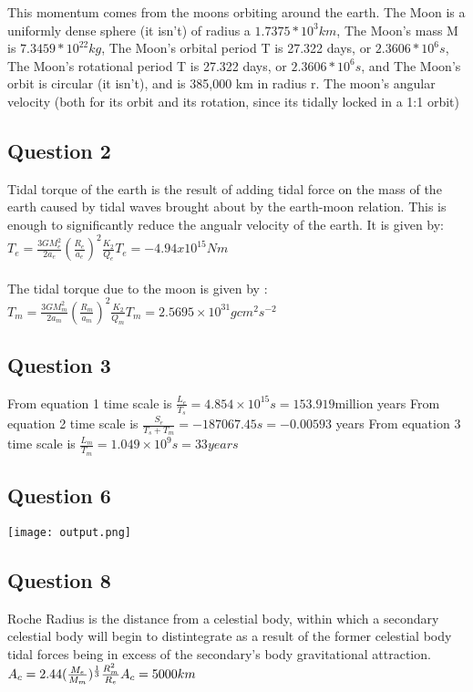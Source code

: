\documentclass[11pt]{article}
\begin{document}
This momentum comes from the moons orbiting around the earth. The Moon
is a uniformly dense sphere (it isn't) of radius a $1.7375*10^3 km$, The
Moon's mass M is $7.3459*10^{22} kg$, The Moon's orbital period T is 27.322
days, or $2.3606*10^6 s$, The Moon's rotational period T is 27.322 days, or
$2.3606*10^6 s$, and The Moon's orbit is circular (it isn't), and is 385,000
km in radius r. The moon's angular velocity (both for its orbit and its
rotation, since its tidally locked in a 1:1 orbit)
\newpage
\subsection{Question 2}\label{question-2}

    Tidal torque of the earth is the result of adding tidal force on the
mass of the earth caused by tidal waves brought about by the earth-moon
relation. This is enough to significantly reduce the angualr velocity of
the earth. It is given by:\\
$T_e=\frac{3GM_e^{2}}{2a_e}(\frac{R_e}{a_e})^2\frac{K_2}{Q_e}
T_e =-4.94x10^{15}Nm$\\
\\
The tidal torque due to the moon is given by :\\
$T_m=\frac{3GM_m^{2}}{2a_m}(\frac{R_m}{a_m})^2\frac{K_2}{Q_m} 
T_m=2.5695×10^{31}gcm^2s^{-2}$

\newpage
\subsection{Question 3}\label{question-3}

From equation 1 time scale is $\frac{L_e}{T_s}=4.854×10^{15}s=153.919$million years 
From equation 2 time scale is $\frac{S_e}{T_s+T_m}=-187067.45s=-0.00593$ years 
From equation 3 time scale is $\frac{L_m}{T_m}=1.049×10^9s=33years$

\newpage
\subsection{Question 6}\label{question-6}
\texttt{[image: output.png]}

\newpage
\subsection{Question 8}\label{question-8}

    Roche Radius is the distance from a celestial body, within which a
secondary celestial body will begin to distintegrate as a result of the
former celestial body tidal forces being in excess of the secondary's
body gravitational attraction.\\
$A_c=2.44(\frac{M_e}{M_m})^{\frac{1}{3}}\frac{R_m^2}{R_e}\\
A_c=5000km$
\end{document}
